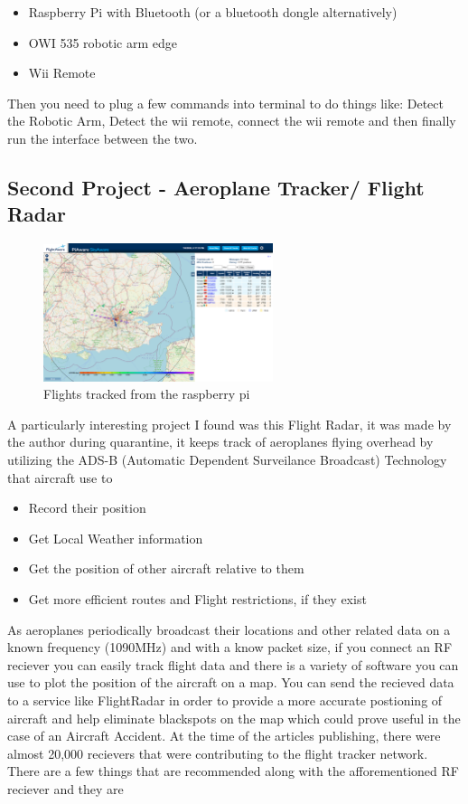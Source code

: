 \documentclass{article}
\begin{document}
		\begin{itemize}
			\item Raspberry Pi with Bluetooth (or a bluetooth dongle alternatively)
			\item OWI 535 robotic arm edge
			\item Wii Remote
		\end{itemize}
		Then you need to plug a few commands into terminal to do things like: Detect the Robotic Arm, Detect the wii remote, connect the wii remote and then finally run the interface between the two. \citep{boardmasterinstructables}
	\newpage
	\subsection{Second Project - Aeroplane Tracker/ Flight Radar}
		\begin{figure}[h!]
			\centering
			\includegraphics[width=0.6\textwidth]{flighttracker.png}
			\caption{Flights tracked from the raspberry pi \citep{bisson}}
		\end{figure}
		A particularly interesting project I found was this Flight Radar, it was made by the author during quarantine, it keeps track of aeroplanes flying overhead by utilizing the ADS-B (Automatic Dependent Surveilance Broadcast) Technology that aircraft use to 
		\begin{itemize}
			\item Record their position
			\item Get Local Weather information
			\item Get the position of other aircraft relative to them
			\item Get more efficient routes and Flight restrictions, if they exist
		\end{itemize}
		As aeroplanes periodically broadcast their locations and other related data on a known frequency (1090MHz) and with a know packet size, if you connect an RF reciever you can easily track flight data and there is a variety of software you can use to plot the position of the aircraft on a map. You can send the recieved data to a service like FlightRadar in order to provide a more accurate postioning of aircraft and help eliminate blackspots on the map which could prove useful in the case of an Aircraft Accident. At the time of the articles publishing, there were almost 20,000 recievers that were contributing to the flight tracker network. There are a few things that are recommended along with the afforementioned RF reciever and they are
\end{document}
